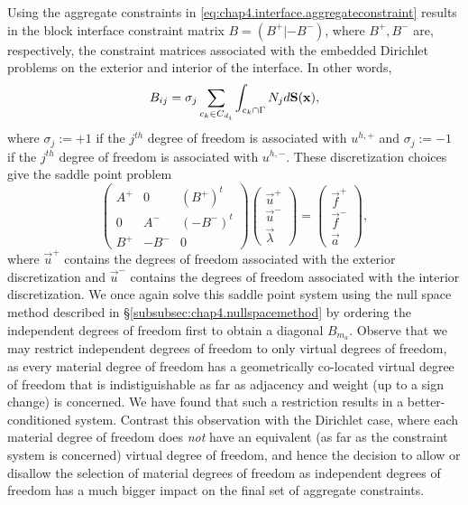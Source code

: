 Using the aggregate constraints in \eqref{eq:chap4.interface.aggregateconstraint} results in the block interface constraint matrix $B = (B^+ | {-B^-})$, where $B^+, B^-$ are, respectively, the constraint matrices associated with the embedded Dirichlet problems on the exterior and interior of the interface. In other words,
\begin{equation} \label{eq:chap4.interface.aggregateconstraint.matrix}
B_{ij} = \sigma_j \sum_{c_k \in C_{d_i}} \int_{c_k \cap \Gamma} N_j d\mathbf{S}(\mathbf{x}),
\end{equation}
where $\sigma_j := +1$ if the $j^{th}$ degree of freedom is associated with $u^{h,+}$ and $\sigma_j := -1$ if the $j^{th}$ degree of freedom is associated with $u^{h,-}$. These discretization choices give the saddle point problem
\begin{equation} \label{eq:chap4.interface.kkt}
\begin{pmatrix} A^+ & 0 & (B^+)^t \\ 0 & A^- & (-B^-)^t \\ B^+ & -B^- & 0 \end{pmatrix}
\begin{pmatrix} \vec{u}^+ \\ \vec{u}^- \\ \vec{\lambda} \end{pmatrix}
= \begin{pmatrix} \vec{f}^+ \\ \vec{f}^- \\ \vec{a} \end{pmatrix},
\end{equation}
where $\vec{u}^+$ contains the degrees of freedom associated with the exterior discretization and $\vec{u}^-$ contains the degrees of freedom associated with the interior discretization. We once again solve this saddle point system using the null space method described in \S\ref{subsubsec:chap4.nullspacemethod} by ordering the independent degrees of freedom first to obtain a diagonal $B_{m_a}$. Observe that we may restrict independent degrees of freedom to only virtual degrees of freedom, as every material degree of freedom has a geometrically co-located virtual degree of freedom that is indistiguishable as far as adjacency and weight (up to a sign change) is concerned. We have found that such a restriction results in a better-conditioned system. Contrast this observation with the Dirichlet case, where each material degree of freedom does \emph{not} have an equivalent (as far as the constraint system is concerned) virtual degree of freedom, and hence the decision to allow or disallow the selection of material degrees of freedom as independent degrees of freedom has a much bigger impact on the final set of aggregate constraints.

